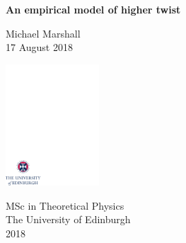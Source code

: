 \documentclass[12pt,a4paper]{report}
\begin{document}
\thispagestyle{empty}

%
\parindent=0pt          %
\parskip=5pt            %
%
%

\vspace*{0.1\textheight}

\begin{center}
        \huge{\bfseries An empirical model of higher twist}\\
\end{center}

\bigskip

\begin{center}
        \large{Michael Marshall}\\      %
        \bigskip
        \large{17 August 2018}        %
\end{center}

\vspace*{0.4\textheight}

\begin{center}
        \includegraphics[width=35mm]{crest.pdf}
\end{center}

\medskip

\begin{center}

\large{
  MSc in Theoretical Physics\\[0.8ex]
  The University of Edinburgh\\[0.8ex]
  2018
}

\end{center}
\end{document}
